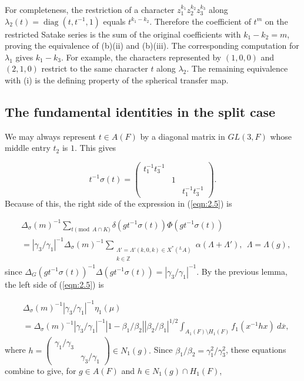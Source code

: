 \documentclass[12pt,letterpaper]{amsart}
\numberwithin{equation}{section}
\theoremstyle{definition}
\theoremstyle{plain}
\def\zzz{\mathbb{Z}}
\def\ovx{\overline{x}}
\begin{document}
For completeness, the restriction of a character
$z_1^{k_1}z_2^{k_2}z_3^{k_3}$ along
$\lambda_2(t)=\operatorname{diag}(t,t^{-1},1)$ equals
$t^{k_1-k_2}$. Therefore the coefficient of $t^m$ on the restricted
Satake series is the sum of the original coefficients with
$k_1-k_2=m$, proving the equivalence of (b)(ii) and (b)(iii).
The corresponding computation for $\lambda_1$ gives $k_1-k_3$.
For example, the characters represented by $(1,0,0)$ and $(2,1,0)$
restrict to the same character $t$ along $\lambda_2$.
The remaining equivalence with (i) is the defining property of the
spherical transfer map.

\subsection{The fundamental identities in the split case}
\label{sec:2.4}

We may always
represent $t\in A(F)$ by a diagonal matrix in $GL(3,F)$ whose middle
entry $t_2$ is $1$. This gives

\[
t^{-1}\sigma (t)
=
\left( 
\begin{array}{ccc} 
t_1^{-1}t_3^{-1}&\ &\ \\
\ &1&\ \\
\ &\ &t_1^{-1}t_3^{-1}
\end{array} 
\right) .
\]
Because of this, the right side of the expression in (\ref{eqn:2.5}) is

\[
\begin{split}
&\Delta_{\sigma}(m)^{-1}\sum_{t \pmod{A\cap K}}
\delta (gt^{-1}\sigma (t))\Phi (gt^{-1}\sigma (t))\\
&=|\gamma_3/\gamma_1|^{-1}\Delta_{\sigma}(m)^{-1}
\sum_{\substack{\Lambda ' =\Lambda '(k,0,k)\in X^*(^{L}A) \\ k\in\zzz}}
\alpha (\Lambda +\Lambda '),\ \ \Lambda =\Lambda (g),
\end{split}
\]
since
$\Delta_G(gt^{-1}\sigma (t))^{-1}\Delta (gt^{-1}\sigma (t))
=|\gamma_3/\gamma_1|^{-1}$. By the previous lemma, the left side of
(\ref{eqn:2.5}) is

\[
\begin{split}
&\Delta_{\sigma}(m)^{-1}|\gamma_3/\gamma_1|^{-1}\eta_1 (\mu )\\
&=\Delta_{\sigma}(m)^{-1}|\gamma_3/\gamma_1|^{-1}
|1-\beta_1/\beta_2||\beta_2/\beta_1|^{1/2}
\int_{A_1(F)\setminus H_1(F)} f_1(x^{-1}hx)\ d\ovx ,
\end{split}
\]
where $h = 
\left( \begin{array}{cc} 
\gamma_1/\gamma_3&\ \\
 \ &\gamma_3/\gamma_1\end{array}
\right) \in N_1(g).$
Since
$\beta_1/\beta_2 = \gamma_1^2/\gamma_3^2$, these equations combine to give, for
$g\in A(F)$ and $h\in N_1(g)\cap H_1(F)$,
\end{document}
